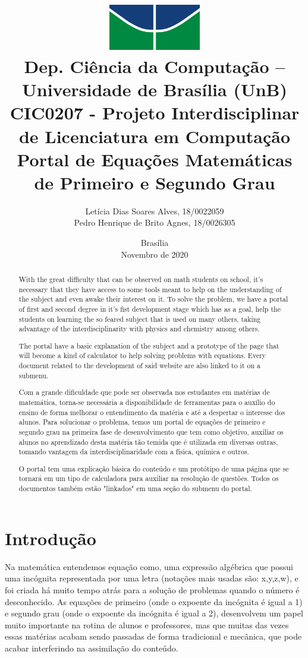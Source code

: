\documentclass[12pt]{report}
\title{
        \includegraphics[width=4cm]{img/logo.jpg} \\ 
        \large
        Dep. Ciência da Computação -- Universidade de Brasília (UnB)\\
        CIC0207 - Projeto Interdisciplinar de Licenciatura em Computação \\
        \vfill 
        \vfill
        \LARGE
        \textbf{Portal de Equações Matemáticas de Primeiro e Segundo Grau}
    }
\author{
        Letícia Dias Soares Alves, 18/0022059\\
        Pedro Henrique de Brito Agnes, 18/0026305
    }
\affil{
        \vfill
        \vfill
        \vfill
        Professora \\
        Dr.a Letícia Lopes Leite
    }
\date{Brasília\\Novembro de 2020}
\begin{document}
\maketitle

\begin{abstract}
  With the great difficulty that can be observed on math students on school, it's necessary that they have access to some tools meant to help on the understanding of the subject and even awake their interest on it. To solve the problem, we have a portal of first and second degree in it's fist development stage which has as a goal, help the students on learning the so feared subject that is used on many others, taking advantage of the interdisciplinarity with physics and chemistry among others.

  The portal have a basic explanation of the subject and a prototype of the page that will become a kind of calculator to help solving problems with equations. Every document related to the development of said website are also linked to it on a submenu.
\end{abstract}

\begin{abstract}
  Com a grande dificuldade que pode ser observada nos estudantes em matérias de matemática, torna-se necessária a disponibilidade de ferramentas para o auxílio do ensino de forma melhorar o entendimento da matéria e até a despertar o interesse dos alunos. Para solucionar o problema, temos um portal de equações de primeiro e segundo grau na primeira fase de desenvolvimento que tem como objetivo, auxiliar os alunos no aprendizado desta matéria tão temida que é utilizada em diversas outras, tomando vantagem da interdisciplinaridade com a física, química e outros.

  O portal tem uma explicação básica do conteúdo e um protótipo de uma página que se tornará em um tipo de calculadora para auxiliar na resolução de questões. Todos os documentos também estão "linkados" em uma seção do submenu do portal.
\end{abstract}

\tableofcontents
\newpage

\chapter{Introdução}
Na matemática entendemos equação como, uma expressão algébrica que possui uma incógnita representada por uma letra (notações mais usadas são: x,y,z,w), e foi criada há muito tempo atrás para a solução de problemas quando o número é desconhecido. As equações de primeiro (onde o expoente da incógnita é igual a 1) e segundo grau  (onde o expoente da incógnita é igual a 2), desenvolvem um papel muito importante na rotina de alunos e professores, mas que muitas das vezes essas matérias acabam sendo passadas de forma tradicional e mecânica, que pode acabar interferindo na assimilação do conteúdo.
\end{document}
